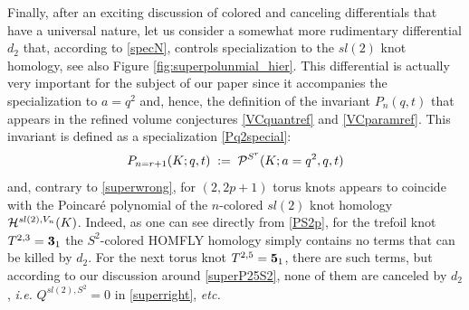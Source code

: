 \documentclass[hyper,letterpaper]{JHEP3}
\newcommand{\be}{\begin{equation}}
\newcommand{\ee}{\end{equation}}
\newcommand{\cH}{{\cal H }}
\renewcommand{\P}{{\cal P}}
\begin{document}
Finally, after an exciting discussion of colored and canceling differentials that have a universal nature,
let us consider a somewhat more rudimentary differential $d_2$ that, according to \eqref{specN},
controls specialization to the $sl(2)$ knot homology, see also Figure \ref{fig:superpolunmial_hier}.
This differential is actually very important for the subject of our paper since it accompanies
the specialization to $a=q^2$ and, hence, the definition of the invariant $P_n (q,t)$
that appears in the refined volume conjectures \eqref{VCquantref} and \eqref{VCparamref}.
This invariant is defined as a specialization \eqref{Pq2special}:
\be
P_{n=r+1}(K;q,t) \; := \; \P^{S^r}(K;a=q^2,q,t)
\label{Pq2special123}
\ee
and, contrary to \eqref{superwrong},
for $(2,2p+1)$ torus knots appears to coincide with the Poincar\'e polynomial
of the $n$-colored $sl(2)$ knot homology $\cH^{sl(2),V_n} (K)$.
Indeed, as one can see directly from \eqref{PS2p}, for the trefoil knot $T^{2,3} = {\bf 3}_1$
the $S^2$-colored HOMFLY homology simply contains no terms that can be killed by $d_2$.
For the next torus knot $T^{2,5} = {\bf 5}_1$, there are such terms, but according to our
discussion around \eqref{superP25S2}, none of them are canceled by $d_2$,
{\it i.e.} $Q^{sl(2),S^2} = 0$ in \eqref{superright}, {\it etc.}
\end{document}
